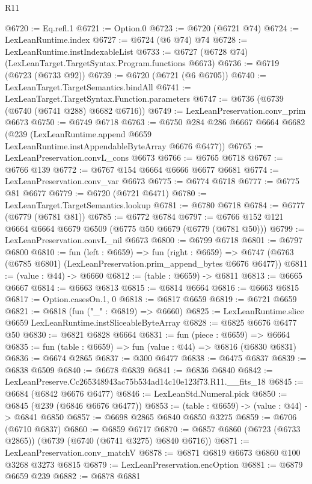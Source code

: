 \begin{lexlean}{R11}
\begin{coremodule}
@6720 := Eq.refl.{1}
@6721 := Option.{0}
@6723 := @6720 (@6721 @74)
@6724 := LexLeanRuntime.index
@6727 := @6724 (@6 @74) @74
@6728 := LexLeanRuntime.instIndexableList
@6733 := @6727 (@6728 @74) (LexLeanTarget.TargetSyntax.Program.functions @6673)
@6736 := @6719 (@6723 (@6733 @92))
@6739 := @6720 (@6721 (@6 @6705))
@6740 := LexLeanTarget.TargetSemantics.bindAll
@6741 := LexLeanTarget.TargetSyntax.Function.parameters
@6747 := @6736 (@6739 (@6740 (@6741 @288) @6682 @6716))
@6749 := LexLeanPreservation.conv_prim @6673
@6750 := @6749 @6718
@6763 := @6750
    @284
    @286
    @6667
    @6664
    @6682
    (@239 (LexLeanRuntime.append @6659 LexLeanRuntime.instAppendableByteArray @6676 @6477))
@6765 := LexLeanPreservation.convL_cons @6673
@6766 := @6765 @6718
@6767 := @6766 @139
@6772 := @6767 @154 @6664 @6666 @6677 @6681
@6774 := LexLeanPreservation.conv_var @6673
@6775 := @6774 @6718
@6777 := @6775 @81 @6677
@6779 := @6720 (@6721 @6471)
@6780 := LexLeanTarget.TargetSemantics.lookup
@6781 := @6780 @6718
@6784 := @6777 (@6779 (@6781 @81))
@6785 := @6772 @6784
@6797 := @6766 @152 @121 @6664 @6664 @6679 @6509 (@6775 @50 @6679 (@6779 (@6781 @50)))
@6799 := LexLeanPreservation.convL_nil @6673
@6800 := @6799 @6718
@6801 := @6797 @6800
@6810 := fun (left : @6659) =>
  fun (right : @6659) =>
  @6747 (@6763 (@6785 @6801) (LexLeanPreservation.prim_append_bytes @6676 @6477))
@6811 := (value : @44) -> @6660
@6812 := (table : @6659) -> @6811
@6813 := @6665 @6667
@6814 := @6663 @6813
@6815 := @6814 @6664
@6816 := @6663 @6815
@6817 := Option.casesOn.{1, 0}
@6818 := @6817 @6659
@6819 := @6721 @6659
@6821 := @6818 (fun ("_" : @6819) => @6660)
@6825 := LexLeanRuntime.slice @6659 LexLeanRuntime.instSliceableByteArray
@6828 := @6825 @6676 @6477 @50
@6830 := @6821 @6828 @6664
@6831 := fun (piece : @6659) => @6664
@6835 := fun (table : @6659) => fun (value : @44) => @6816 (@6830 @6831)
@6836 := @6674 @2865
@6837 := @300 @6477
@6838 := @6475 @6837
@6839 := @6838 @6509
@6840 := @6678 @6839
@6841 := @6836 @6840
@6842 := LexLeanPreserve.Cc265348943ac75b534ad14c10e123f73.R11.__fits_18
@6845 := @6684 (@6842 @6676 @6477)
@6846 := LexLeanStd.Numeral.pick
@6850 := @6845 (@239 (@6846 @6676 @6477))
@6853 := (table : @6659) -> (value : @44) -> @6841 @6850
@6857 := @6698 @2865 @6840 @6850 @3275
@6859 := @6706 (@6710 @6837)
@6860 := @6859 @6717
@6870 := @6857 @6860 (@6723 (@6733 @2865)) (@6739 (@6740 (@6741 @3275) @6840 @6716))
@6871 := LexLeanPreservation.conv_matchV
@6878 := @6871 @6819 @6673 @6860 @100 @3268 @3273 @6815
@6879 := LexLeanPreservation.encOption
@6881 := @6879 @6659 @239
@6882 := @6878 @6881

\end{coremodule}
\end{lexlean}
